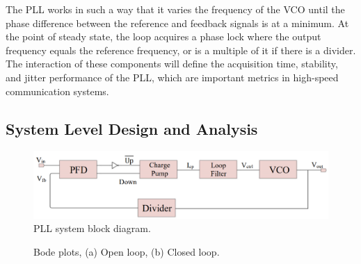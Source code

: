 \documentclass[lettersize,journal]{IEEEtran}
\begin{document}
The PLL works in such a way that it varies the frequency of the VCO until the phase difference between the reference and feedback signals is at a minimum. At the point of steady state, the loop acquires a phase lock where the output frequency equals the reference frequency, or is a multiple of it if there is a divider. The interaction of these components will define the acquisition time, stability, and jitter performance of the PLL, which are important metrics in high-speed communication systems.

\subsection{System Level Design and Analysis}
\label{sec:system_level_analysis}

\begin{figure}[!h]
    \centering
    \includegraphics[width=1\linewidth]{images/intro_system_level/pll_block_diagram.png}
    \caption{PLL system block diagram.}
    \label{fig:pll_block_diagram}
\end{figure}

\begin{figure}[!ht]
    \centering
    \hfil
    \hfil
    \caption{Bode plots, (a) Open loop, (b) Closed loop.}
    \label{fig:bode_plots}
\end{figure}
\end{document}

